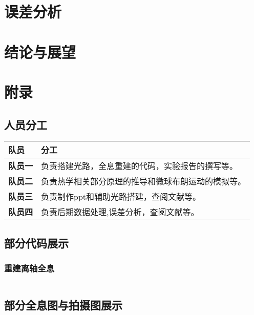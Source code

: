 \documentclass[a4paper]{report}
\begin{document}
\chapter{误差分析}

\chapter{结论与展望}

\chapter{附录}
\section{人员分工}
\renewcommand{\arraystretch}{1.3} %
\begin{tabularx}{\textwidth}{>{\bfseries}l X}
\toprule
队员 & 分工 \\
\midrule
队员一 & 负责搭建光路，全息重建的代码，实验报告的撰写等。 \\
队员二 & 负责热学相关部分原理的推导和微球布朗运动的模拟等。 \\
队员三 & 负责制作ppt和辅助光路搭建，查阅文献等。 \\
队员四 & 负责后期数据处理,误差分析，查阅文献等。 \\
\bottomrule
\end{tabularx}

\section{部分代码展示}

\subsection{重建离轴全息}
\begin{lstlisting}[language=Python, caption=离轴全息重建, label=code:generator]

\end{lstlisting}

\section{部分全息图与拍摄图展示}




\end{document}
